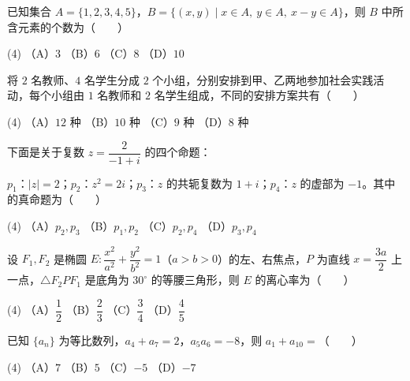 \begin{question}
已知集合 $A=\{1,2,3,4,5\}$，$B=\{(x,y)\mid x\in A,\ y\in A,\ x-y\in A\}$，则 $B$ 中所含元素的个数为\mbox{（　　）}

\begin{gkopts}(4)
\task （A）$3$
\task （B）$6$
\task （C）$8$
\task （D）$10$
\end{gkopts}

\end{question}
\begin{question}
将 $2$ 名教师、$4$ 名学生分成 $2$ 个小组，分别安排到甲、乙两地参加社会实践活动，每个小组由 $1$ 名教师和 $2$ 名学生组成，不同的安排方案共有\mbox{（　　）}

\begin{gkopts}(4)
\task （A）$12$ 种
\task （B）$10$ 种
\task （C）$9$ 种
\task （D）$8$ 种
\end{gkopts}

\end{question}
\begin{question}
下面是关于复数 $z=\dfrac{2}{-1+i}$ 的四个命题：

$p_1$：$|z|=2$；$p_2$：$z^2=2i$；$p_3$：$z$ 的共轭复数为 $1+i$；$p_4$：$z$ 的虚部为 $-1$。其中的真命题为\mbox{（　　）}

\begin{gkopts}(4)
\task （A）$p_2,p_3$
\task （B）$p_1,p_2$
\task （C）$p_2,p_4$
\task （D）$p_3,p_4$
\end{gkopts}

\end{question}
\begin{question}
设 $F_1,F_2$ 是椭圆 $E:\dfrac{x^2}{a^2}+\dfrac{y^2}{b^2}=1$（$a>b>0$）的左、右焦点，$P$ 为直线 $x=\dfrac{3a}{2}$ 上一点，$\triangle F_2PF_1$ 是底角为 $30^\circ$ 的等腰三角形，则 $E$ 的离心率为\mbox{（　　）}

\begin{gkopts}(4)
\task （A）$\dfrac12$
\task （B）$\dfrac23$
\task （C）$\dfrac34$
\task （D）$\dfrac45$
\end{gkopts}

\end{question}
\begin{question}
已知 $\{a_n\}$ 为等比数列，$a_4+a_7=2$，$a_5a_6=-8$，则 $a_1+a_{10}=$\mbox{（　　）}

\begin{gkopts}(4)
\task （A）$7$
\task （B）$5$
\task （C）$-5$
\task （D）$-7$
\end{gkopts}

\Needspace{0.4\textheight}
\end{question}
